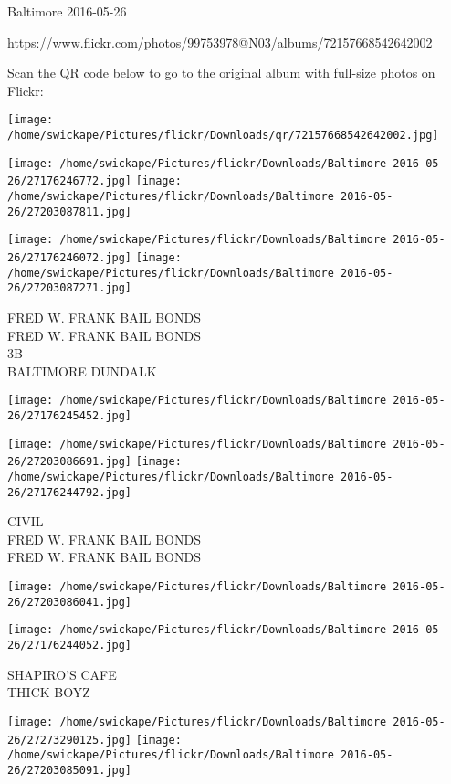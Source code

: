 \documentclass[10pt,letterpaper]{article}
\begin{document}
Baltimore 2016-05-26

https://www.flickr.com/photos/99753978@N03/albums/72157668542642002

Scan the QR code below to go to the original album with full-size photos on Flickr:

\texttt{[image: /home/swickape/Pictures/flickr/Downloads/qr/72157668542642002.jpg]}
\pagebreak

\texttt{[image: /home/swickape/Pictures/flickr/Downloads/Baltimore 2016-05-26/27176246772.jpg]}
\texttt{[image: /home/swickape/Pictures/flickr/Downloads/Baltimore 2016-05-26/27203087811.jpg]}

\texttt{[image: /home/swickape/Pictures/flickr/Downloads/Baltimore 2016-05-26/27176246072.jpg]}
\texttt{[image: /home/swickape/Pictures/flickr/Downloads/Baltimore 2016-05-26/27203087271.jpg]}

FRED W. FRANK BAIL BONDS\\
FRED W. FRANK BAIL BONDS\\
3B\\
BALTIMORE DUNDALK\\
\pagebreak

\texttt{[image: /home/swickape/Pictures/flickr/Downloads/Baltimore 2016-05-26/27176245452.jpg]}

\vspace{0.25in}
\texttt{[image: /home/swickape/Pictures/flickr/Downloads/Baltimore 2016-05-26/27203086691.jpg]}
\texttt{[image: /home/swickape/Pictures/flickr/Downloads/Baltimore 2016-05-26/27176244792.jpg]}

CIVIL\\
FRED W. FRANK BAIL BONDS\\
FRED W. FRANK BAIL BONDS\\
\pagebreak

\texttt{[image: /home/swickape/Pictures/flickr/Downloads/Baltimore 2016-05-26/27203086041.jpg]}

\vspace{0.25in}
\texttt{[image: /home/swickape/Pictures/flickr/Downloads/Baltimore 2016-05-26/27176244052.jpg]}

SHAPIRO'S CAFE\\
THICK BOYZ\\
\pagebreak

\texttt{[image: /home/swickape/Pictures/flickr/Downloads/Baltimore 2016-05-26/27273290125.jpg]}
\texttt{[image: /home/swickape/Pictures/flickr/Downloads/Baltimore 2016-05-26/27203085091.jpg]}
\end{document}
